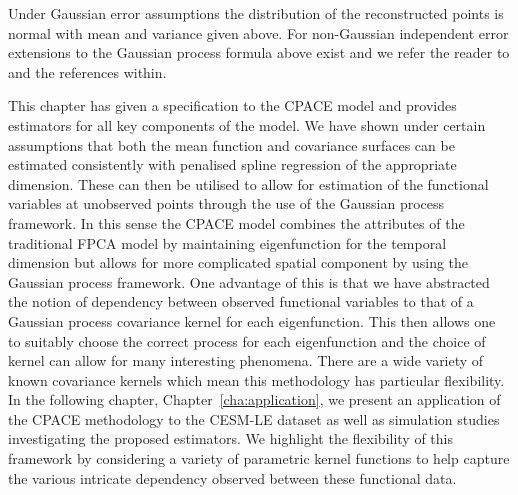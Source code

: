 Under Gaussian error assumptions the distribution of the reconstructed points is normal with mean and variance given above.
For non-Gaussian independent error extensions to the Gaussian process formula above exist and we refer the reader to \citep[Ch.~9]{williams_gaussian_2006} and the references within.

This chapter has given a specification to the CPACE model and provides estimators for all key components of the model.
We have shown under certain assumptions that both the mean function and covariance surfaces can be estimated consistently with penalised spline regression of the appropriate dimension.
These can then be utilised to allow for estimation of the functional variables at unobserved points through the use of the Gaussian process framework.
In this sense the CPACE model combines the attributes of the traditional FPCA model by maintaining eigenfunction for the temporal dimension but allows for more complicated spatial component by using the Gaussian process framework. 
One advantage of this is that we have abstracted the notion of dependency between observed functional variables to that of a Gaussian process covariance kernel for each eigenfunction.
This then allows one to suitably choose the correct process for each eigenfunction and the choice of kernel can allow for many interesting phenomena.
There are a wide variety of known covariance kernels which mean this methodology has particular flexibility.
In the following chapter, Chapter~\ref{cha:application}, we present an application of the CPACE methodology to the CESM-LE dataset as well as simulation studies investigating the proposed estimators.
We highlight the flexibility of this framework by considering a variety of parametric kernel functions to help capture the various intricate dependency observed between these functional data.